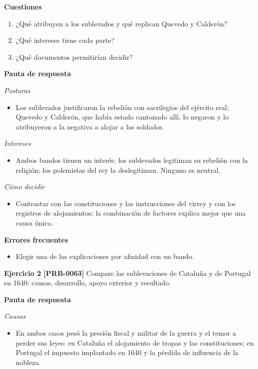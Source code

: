 \documentclass{book}
\begin{document}
\noindent\textbf{Cuestiones}
\begin{enumerate}
\item ¿Qué atribuyen a los sublevados y qué replican Quevedo y Calderón?
\item ¿Qué intereses tiene cada parte?
\item ¿Qué documentos permitirían decidir?
\end{enumerate}

\noindent\textbf{Pauta de respuesta}

\noindent\textit{Posturas}
\begin{itemize}
\item Los sublevados justificaron la rebelión con sacrilegios del ejército real; Quevedo y Calderón, que había estado cantonado allí, lo negaron y lo atribuyeron a la negativa a alojar a los soldados.
\end{itemize}

\noindent\textit{Intereses}
\begin{itemize}
\item Ambos bandos tienen un interés: los sublevados legitiman su rebelión con la religión; los polemistas del rey la deslegitiman. Ninguno es neutral.
\end{itemize}

\noindent\textit{Cómo decidir}
\begin{itemize}
\item Contrastar con las constituciones y las instrucciones del virrey y con los registros de alojamientos; la combinación de factores explica mejor que una causa única.
\end{itemize}

\noindent\textbf{Errores frecuentes}
\begin{itemize}
\item Elegir una de las explicaciones por afinidad con un bando.
\end{itemize}

\noindent\textbf{Ejercicio 2 [PRB-0063]}
Compare las sublevaciones de Cataluña y de Portugal en 1640: causas, desarrollo, apoyo exterior y resultado.


\noindent\textbf{Pauta de respuesta}

\noindent\textit{Causas}
\begin{itemize}
\item En ambos casos pesó la presión fiscal y militar de la guerra y el temor a perder sus leyes: en Cataluña el alojamiento de tropas y las constituciones; en Portugal el impuesto implantado en 1640 y la pérdida de influencia de la nobleza.
\end{itemize}
\end{document}
